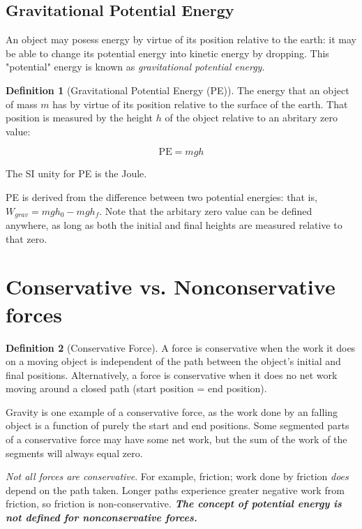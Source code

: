 \documentclass[12pt, a4paper]{article}
\theoremstyle{definition}
\newtheorem{definition}{Definition}
\begin{document}
\subsection{Gravitational Potential Energy}
An object may posess energy by virtue of its position relative to the earth: it may be able to change its potential energy into kinetic energy by dropping.
This "potential" energy is known as \emph{gravitational potential energy}.

\begin{definition}[Gravitational Potential Energy (PE)]
    The energy that an object of mass $m$ has by virtue of its position relative to the surface of the earth. That position is measured by the height $h$ of the object relative to an
    abritary zero value:

    \[\mathrm{PE} = mgh\]

    The SI unity for PE is the Joule.
\end{definition}

PE is derived from the difference between two potential energies: that is, $W_{grav} = mgh_0 - mgh_f$.
Note that the arbitary zero value can be defined anywhere, as long as both the initial and final heights are measured relative to that zero.

\newpage

\section{Conservative vs. Nonconservative forces}
\begin{definition}[Conservative Force]
    A force is conservative when the work it does on a moving object is independent of the path between the object's initial and final positions.
    Alternatively, a force is conservative when it does no net work moving around a closed path (start position = end position).
\end{definition}

Gravity is one example of a conservative force, as the work done by an falling object is a function of purely the start and end positions. Some segmented parts of a conservative force may have some net work, but the sum of the work of the segments will always equal zero.

\emph{Not all forces are conservative}. For example, friction; work done by friction \emph{does} depend on the path taken. Longer paths experience greater negative work from friction, so friction is non-conservative. \emph{\textbf{The concept of potential energy is not defined for nonconservative forces.}}
\end{document}
